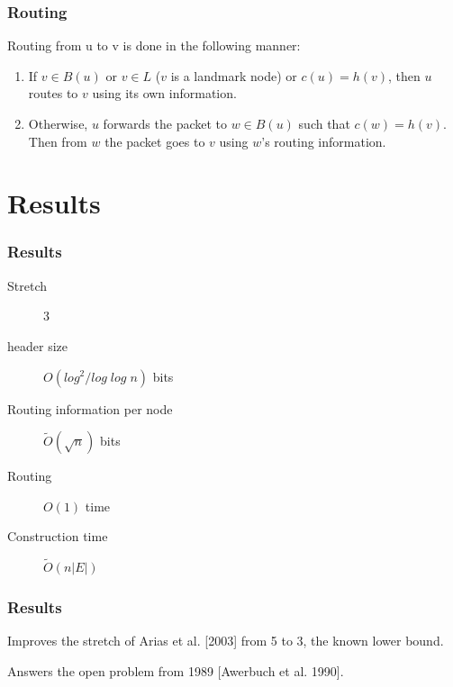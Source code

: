 \documentclass[10pt, compress]{beamer}
\begin{document}
\begin{frame}[fragile]
  \frametitle{Routing}
  \begin{block}{Routing from u to v is done in the following manner:}
    \begin{enumerate}
        \item If $v \in B(u)$ or $v \in L$ ($v$ is a landmark node) or $c(u) =
            h(v)$, then $u$ routes to $v$ using its own information.
        \item Otherwise, $u$ forwards the packet to $w \in B(u)$ such that
            $c(w) = h(v)$. Then from $w$ the packet goes to $v$ using $w$’s
            routing information.
    \end{enumerate}
  \end{block}


\end{frame}


\section{Results}

\begin{frame}[fragile]
  \frametitle{Results}

  \begin{description}
    \item[Stretch] 3
    \item[header size] $O(log^2/log\;log\;n)$ bits
    \item[Routing information per node] $\tilde{O}(\sqrt{n})$ bits
    \item[Routing] $O(1)$ time
    \item[Construction time] $\tilde{O}(n|E|)$
  \end{description}

\end{frame}

\begin{frame}[fragile]
  \frametitle{Results}
  Improves the stretch of Arias et al. [2003] from 5 to 3, the known lower bound.

  Answers the open problem from 1989 [Awerbuch et al. 1990].

\end{frame}


\end{document}
